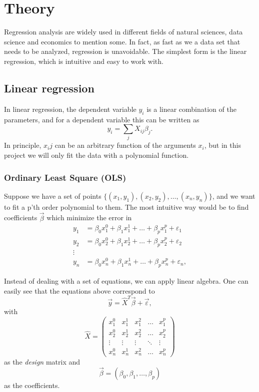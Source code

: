 \section{Theory} \label{sec:theory}
Regression analysis are widely used in different fields of natural sciences, data science and economics to mention some. In fact, as fast as we a data set that needs to be analyzed, regression is unavoidable. The simplest form is the linear regression, which is intuitive and easy to work with. 
 
\subsection{Linear regression} \label{sec:regression}
In linear regression, the dependent variable $y_i$ is a linear combination of the parameters, and for a dependent variable this can be written as
\begin{equation}
y_i=\sum_jX_{ij}\beta_j.
\end{equation}
In principle, $x_ij$ can be an arbitrary function of the arguments $x_i$, but in this project we will only fit the data with a polynomial function. \cite{Hastie}

\subsubsection{Ordinary Least Square (OLS)} \label{sec:OLS}
Suppose we have a set of points $\{(x_1, y_1), (x_2, y_2),\hdots, (x_n, y_n)\}$, and we want to fit a p'th order polynomial to them. The most intuitive way would be to find coefficients $\vec{\beta}$ which minimize the error in
\begin{align*}
y_1&=\beta_0x_1^0+\beta_1x_1^1+\hdots+\beta_px_1^p+\varepsilon_1\\
y_2&=\beta_0x_2^0+\beta_1x_2^1+\hdots+\beta_px_2^p+\varepsilon_2\\
\vdots\\
y_n&=\beta_0x_n^0+\beta_1x_n^1+\hdots+\beta_px_n^p+\varepsilon_n,
\end{align*}

Instead of dealing with a set of equations, we can apply linear algebra. One can easily see that the equations above correspond to
\begin{equation}
\vec{y}=\hat{X}^T\vec{\beta}+\vec{\varepsilon},
\label{eq:y_xb}
\end{equation}
with
\begin{equation}
\hat{X}=\begin{pmatrix}
x_1^0&x_1^1&x_1^2&\hdots&x_1^p\\
x_2^0&x_2^1&x_2^2&\hdots&x_2^p\\
\vdots&\vdots&\vdots&\ddots&\vdots\\
x_n^0&x_n^1&x_n^2&\hdots&x_n^p
\end{pmatrix}
\end{equation}
as the \textit{design} matrix and
\begin{equation}
\vec{\beta}=(\beta_0, \beta_1, \hdots, \beta_p)
\end{equation}
as the coefficients. 

